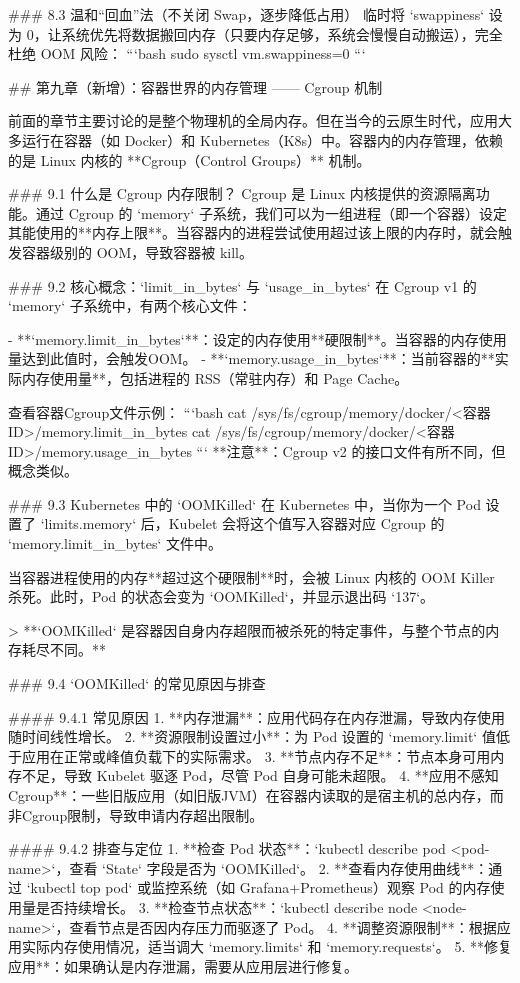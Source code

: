 ### 8.3 温和“回血”法（不关闭 Swap，逐步降低占用）
临时将 `swappiness` 设为 0，让系统优先将数据搬回内存（只要内存足够，系统会慢慢自动搬运），完全杜绝 OOM 风险：
```bash
sudo sysctl vm.swappiness=0
```


## 第九章（新增）：容器世界的内存管理 —— Cgroup 机制

前面的章节主要讨论的是整个物理机的全局内存。但在当今的云原生时代，应用大多运行在容器（如 Docker）和 Kubernetes（K8s）中。容器内的内存管理，依赖的是 Linux 内核的 **Cgroup（Control Groups）** 机制。

### 9.1 什么是 Cgroup 内存限制？
Cgroup 是 Linux 内核提供的资源隔离功能。通过 Cgroup 的 `memory` 子系统，我们可以为一组进程（即一个容器）设定其能使用的**内存上限**。当容器内的进程尝试使用超过该上限的内存时，就会触发容器级别的 OOM，导致容器被 kill。

### 9.2 核心概念：`limit_in_bytes` 与 `usage_in_bytes`
在 Cgroup v1 的 `memory` 子系统中，有两个核心文件：

-   **`memory.limit_in_bytes`**：设定的内存使用**硬限制**。当容器的内存使用量达到此值时，会触发OOM。
-   **`memory.usage_in_bytes`**：当前容器的**实际内存使用量**，包括进程的 RSS（常驻内存）和 Page Cache。

查看容器Cgroup文件示例：
```bash
cat /sys/fs/cgroup/memory/docker/<容器ID>/memory.limit_in_bytes
cat /sys/fs/cgroup/memory/docker/<容器ID>/memory.usage_in_bytes
```
**注意**：Cgroup v2 的接口文件有所不同，但概念类似。

### 9.3 Kubernetes 中的 `OOMKilled`
在 Kubernetes 中，当你为一个 Pod 设置了 `limits.memory` 后，Kubelet 会将这个值写入容器对应 Cgroup 的 `memory.limit_in_bytes` 文件中。

当容器进程使用的内存**超过这个硬限制**时，会被 Linux 内核的 OOM Killer 杀死。此时，Pod 的状态会变为 `OOMKilled`，并显示退出码 `137`。

> **`OOMKilled` 是容器因自身内存超限而被杀死的特定事件，与整个节点的内存耗尽不同。**

### 9.4 `OOMKilled` 的常见原因与排查

#### 9.4.1 常见原因
1.  **内存泄漏**：应用代码存在内存泄漏，导致内存使用随时间线性增长。
2.  **资源限制设置过小**：为 Pod 设置的 `memory.limit` 值低于应用在正常或峰值负载下的实际需求。
3.  **节点内存不足**：节点本身可用内存不足，导致 Kubelet 驱逐 Pod，尽管 Pod 自身可能未超限。
4.  **应用不感知Cgroup**：一些旧版应用（如旧版JVM）在容器内读取的是宿主机的总内存，而非Cgroup限制，导致申请内存超出限制。

#### 9.4.2 排查与定位
1.  **检查 Pod 状态**：`kubectl describe pod <pod-name>`，查看 `State` 字段是否为 `OOMKilled`。
2.  **查看内存使用曲线**：通过 `kubectl top pod` 或监控系统（如 Grafana+Prometheus）观察 Pod 的内存使用量是否持续增长。
3.  **检查节点状态**：`kubectl describe node <node-name>`，查看节点是否因内存压力而驱逐了 Pod。
4.  **调整资源限制**：根据应用实际内存使用情况，适当调大 `memory.limits` 和 `memory.requests`。
5.  **修复应用**：如果确认是内存泄漏，需要从应用层进行修复。


